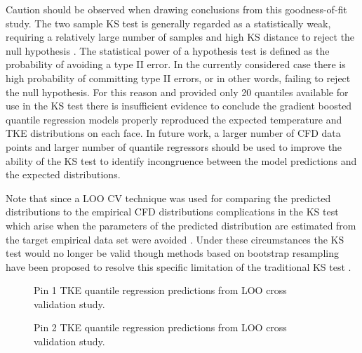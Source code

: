 Caution should be observed when drawing conclusions from this goodness-of-fit study.
The two sample KS test is generally regarded as a statistically weak, requiring a relatively large number of samples and high KS distance to reject the null hypothesis \cite{ks_power} \cite{KHAMIS1990317}.  The statistical power of a hypothesis test is defined as the probability of avoiding a type II error.  In the currently considered case there is high probability of committing type II errors, or in other words, failing to reject the null hypothesis.  For this reason and provided only 20 quantiles available for use in the KS test there is insufficient evidence to conclude the gradient boosted quantile regression models properly reproduced the expected temperature and TKE distributions on each face.  In future work, a larger number of CFD data points and larger number of quantile regressors should be used to improve the ability of the KS test to identify incongruence between the model predictions and the expected distributions.

Note that since a LOO CV technique was used for comparing the predicted distributions to the empirical CFD distributions complications in the KS test which arise when the parameters of the predicted distribution are estimated from the target empirical data set were avoided \cite{kstestInfo}.   Under these circumstances the KS test would no longer be valid though methods based on bootstrap resampling have been proposed to resolve this specific limitation of the traditional KS test \cite{kstestInfo}.

\begin{figure}[H]%
    \centering
    \qquad
    \caption[Q-Q LOO TKE pin 1 results.]{Pin 1 TKE quantile regression predictions from LOO cross validation study.}%
    \label{fig:tkepin1}%
\end{figure}

\begin{figure}[H]%
    \centering
    \qquad
    \caption[Q-Q LOO TKE pin 2 results.]{Pin 2 TKE quantile regression predictions from LOO cross validation study.}%
    \label{fig:tkepin2}%
\end{figure}

